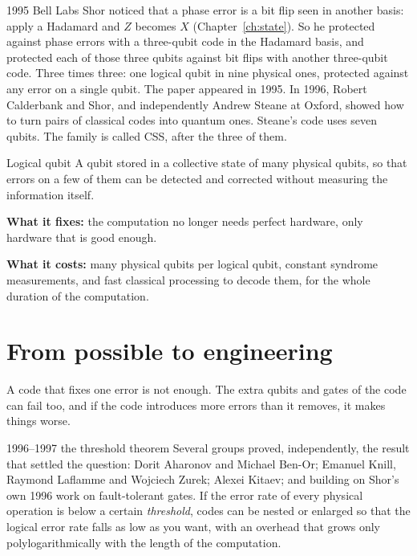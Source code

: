 \begin{history}{1995 \textperiodcentered{} Bell Labs}
Shor noticed that a phase error is a bit flip seen in another basis: apply a
Hadamard and $Z$ becomes $X$ (Chapter~\ref{ch:state}). So he protected against phase
errors with a three-qubit code in the Hadamard basis, and protected each of those
three qubits against bit flips with another three-qubit code. Three times three: one
logical qubit in nine physical ones, protected against any error on a single qubit.
The paper appeared in 1995. In 1996, Robert Calderbank and Shor, and independently
Andrew Steane at Oxford, showed how to turn pairs of classical codes into quantum
ones. Steane's code uses seven qubits. The family is called CSS, after the three of
them.
\end{history}

\begin{concept}{Logical qubit}
A qubit stored in a collective state of many physical qubits, so that errors on a
few of them can be detected and corrected without measuring the information itself.

\textbf{What it fixes:} the computation no longer needs perfect hardware, only
hardware that is good enough.

\textbf{What it costs:} many physical qubits per logical qubit, constant syndrome
measurements, and fast classical processing to decode them, for the whole duration
of the computation.
\end{concept}

\section{From possible to engineering}

A code that fixes one error is not enough. The extra qubits and gates of the code
can fail too, and if the code introduces more errors than it removes, it makes
things worse.

\begin{history}{1996--1997 \textperiodcentered{} the threshold theorem}
Several groups proved, independently, the result that settled the question: Dorit
Aharonov and Michael Ben-Or; Emanuel Knill, Raymond Laflamme and Wojciech Zurek;
Alexei Kitaev; and building on Shor's own 1996 work on fault-tolerant gates. If the
error rate of every physical operation is below a certain \emph{threshold}, codes
can be nested or enlarged so that the logical error rate falls as low as you want,
with an overhead that grows only polylogarithmically with the length of the
computation.
\end{history}

